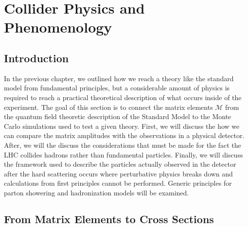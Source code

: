 \chapter{Collider Physics and Phenomenology}

\section{Introduction}

In the previous chapter, we outlined how we reach a theory like the standard model from fundamental principles, but 
a considerable amount of physics is required to reach a practical theoretical description of what occurs inside of 
the experiment. The goal of this section is to connect the matrix elements $\mathcal{M}$ from the quantum field
theoretic description  of the Standard Model to the Monte Carlo simulations used to test a given theory. 
First, we will discuss the how
we can compare the matrix amplitudes with the observations in a physical detector. After, we will the discuss the considerations 
that must be made for the fact the LHC collides hadrons rather than fundamental particles. Finally, we will discuss the framework used to describe the particles actually observed in the detector after the hard scattering occurs where perturbative physics breaks down and  calculations from first principles cannot be performed. Generic principles for parton showering and hadronization models will be examined. 

\section{From Matrix Elements to Cross Sections} 

